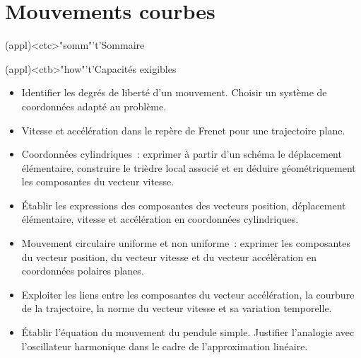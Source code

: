\documentclass[../../main/main.tex]{subfiles}
\begin{document}
\setcounter{chapter}{2}


\chapter{Mouvements courbes}

\vspace*{\fill}

\begin{tcn}(appl)<ctc>"somm"'t'{Sommaire}
	\let\item\olditem
	\vspace{-15pt}
	\minitoc
	\vspace{-25pt}
\end{tcn}

\begin{tcn}[sidebyside]
	(appl)<ctb>"how"'t'{Capacités exigibles}
	\begin{itemize}[label=\rcheck]
		\item Identifier les degrés de liberté d'un mouvement. Choisir un système
		      de coordonnées adapté au problème.

		\item Vitesse et accélération dans le repère de Frenet pour une
		      trajectoire plane.

		\item Coordonnées cylindriques~: exprimer à partir d'un schéma le
		      déplacement élémentaire, construire le trièdre local associé et en
		      déduire géométriquement les composantes du vecteur vitesse.

		\item Établir les expressions des composantes des vecteurs position,
		      déplacement élémentaire, vitesse et accélération en coordonnées
		      cylindriques.
	\end{itemize}
	\tcblower
	\begin{itemize}[label=\rcheck]
		\item Mouvement circulaire uniforme et non uniforme~: exprimer les
		      composantes du vecteur position, du vecteur vitesse et du vecteur
		      accélération en coordonnées polaires planes.

		\item Exploiter les liens entre les composantes du vecteur accélération,
		      la courbure de la trajectoire, la norme du vecteur vitesse et sa
		      variation temporelle.

		\item Établir l’équation du mouvement du pendule simple. Justifier
		      l’analogie avec l'oscillateur harmonique dans le cadre de
		      l'approximation linéaire.
	\end{itemize}
\end{tcn}
\end{document}
